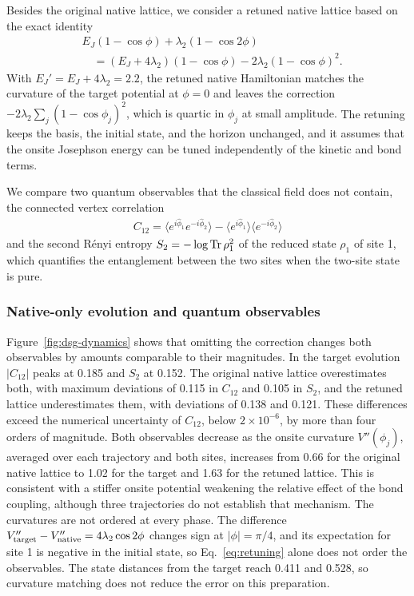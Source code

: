 \documentclass[pra,twocolumn,superscriptaddress,nofootinbib,floatfix]{revtex4-2}
\theoremstyle{remark}
\newcommand{\revcolor}{\color{blue}}
\DeclareRobustCommand{\rev}[1]{{\revcolor #1}}
\begin{document}
\rev{Besides the original native lattice, we consider a retuned native lattice based on the exact identity}
\begingroup\revcolor
\begin{align}
&E_J(1-\cos\phi)+\lambda_2(1-\cos2\phi)\nonumber\\
&\quad=(E_J+4\lambda_2)(1-\cos\phi)-2\lambda_2(1-\cos\phi)^2 .
\label{eq:retuning}
\end{align}
\endgroup
\rev{With \(E_J'=E_J+4\lambda_2=2.2\), the retuned native Hamiltonian matches the curvature of the target potential at \(\phi=0\) and leaves the correction \(-2\lambda_2\sum_j(1-\cos\phi_j)^2\), which is quartic in \(\phi_j\) at small amplitude.} \rev{The retuning keeps the basis, the initial state, and the horizon unchanged, and it assumes that the onsite Josephson energy can be tuned independently of the kinetic and bond terms.}

\rev{We compare two quantum observables that the classical field does not contain, the connected vertex correlation}
\begingroup\revcolor
\begin{align}
C_{12}=\langle e^{i\hat\phi_1}e^{-i\hat\phi_2}\rangle-\langle e^{i\hat\phi_1}\rangle\langle e^{-i\hat\phi_2}\rangle
\end{align}
\endgroup
\rev{and the second R\'enyi entropy \(S_2=-\log{\rm Tr}\,\rho_1^2\) of the reduced state \(\rho_1\) of site 1, which quantifies the entanglement between the two sites when the two-site state is pure.}

\subsubsection{\rev{Native-only evolution and quantum observables}}

\rev{Figure~\ref{fig:dsg-dynamics} shows that omitting the correction changes both observables by amounts comparable to their magnitudes.} \rev{In the target evolution \(|C_{12}|\) peaks at 0.185 and \(S_2\) at 0.152.} \rev{The original native lattice overestimates both, with maximum deviations of 0.115 in \(C_{12}\) and 0.105 in \(S_2\), and the retuned lattice underestimates them, with deviations of 0.138 and 0.121.} \rev{These differences exceed the numerical uncertainty of \(C_{12}\), below \(2\times10^{-6}\), by more than four orders of magnitude.} \rev{Both observables decrease as the onsite curvature \(V''(\phi_j)\), averaged over each trajectory and both sites, increases from 0.66 for the original native lattice to 1.02 for the target and 1.63 for the retuned lattice.} \rev{This is consistent with a stiffer onsite potential weakening the relative effect of the bond coupling, although three trajectories do not establish that mechanism.} \rev{The curvatures are not ordered at every phase.} \rev{The difference \(V_{\rm target}''-V_{\rm native}''=4\lambda_2\cos2\phi\) changes sign at \(|\phi|=\pi/4\), and its expectation for site 1 is negative in the initial state, so Eq.~\eqref{eq:retuning} alone does not order the observables.} \rev{The state distances from the target reach 0.411 and 0.528, so curvature matching does not reduce the error on this preparation.}
\end{document}
